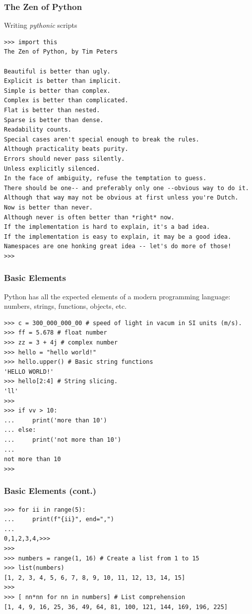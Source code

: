 \documentclass[aspectratio=169]{beamer}
\begin{document}
\begin{frame}[fragile]
    \frametitle{The Zen of Python}
Writing \textit{pythonic} scripts
\scriptsize
\begin{verbatim}
>>> import this
The Zen of Python, by Tim Peters

Beautiful is better than ugly.
Explicit is better than implicit.
Simple is better than complex.
Complex is better than complicated.
Flat is better than nested.
Sparse is better than dense.
Readability counts.
Special cases aren't special enough to break the rules.
Although practicality beats purity.
Errors should never pass silently.
Unless explicitly silenced.
In the face of ambiguity, refuse the temptation to guess.
There should be one-- and preferably only one --obvious way to do it.
Although that way may not be obvious at first unless you're Dutch.
Now is better than never.
Although never is often better than *right* now.
If the implementation is hard to explain, it's a bad idea.
If the implementation is easy to explain, it may be a good idea.
Namespaces are one honking great idea -- let's do more of those!
>>>
\end{verbatim}
\normalsize
\end{frame}

\begin{frame}[fragile]
    \frametitle{Basic Elements}
Python has all the expected elements of a modern programming language: numbers, strings, functions, objects, etc.
\scriptsize

\begin{verbatim}
>>> c = 300_000_000_00 # speed of light in vacum in SI units (m/s).
>>> ff = 5.678 # float number
>>> zz = 3 + 4j # complex number
>>> hello = "hello world!"
>>> hello.upper() # Basic string functions
'HELLO WORLD!'
>>> hello[2:4] # String slicing.
'll'
>>>
>>> if vv > 10:
...     print('more than 10')
... else:
...     print('not more than 10')
...
not more than 10
>>>
\end{verbatim}
    \normalsize
\end{frame}

\begin{frame}[fragile]
\frametitle{Basic Elements (cont.)}
\scriptsize
\begin{verbatim}
>>> for ii in range(5):
...     print(f"{ii}", end=",")
...
0,1,2,3,4,>>>
>>>
>>> numbers = range(1, 16) # Create a list from 1 to 15
>>> list(numbers)
[1, 2, 3, 4, 5, 6, 7, 8, 9, 10, 11, 12, 13, 14, 15]
>>>
>>> [ nn*nn for nn in numbers] # List comprehension
[1, 4, 9, 16, 25, 36, 49, 64, 81, 100, 121, 144, 169, 196, 225]
\end{verbatim}
\normalsize
\end{frame}
\end{document}
